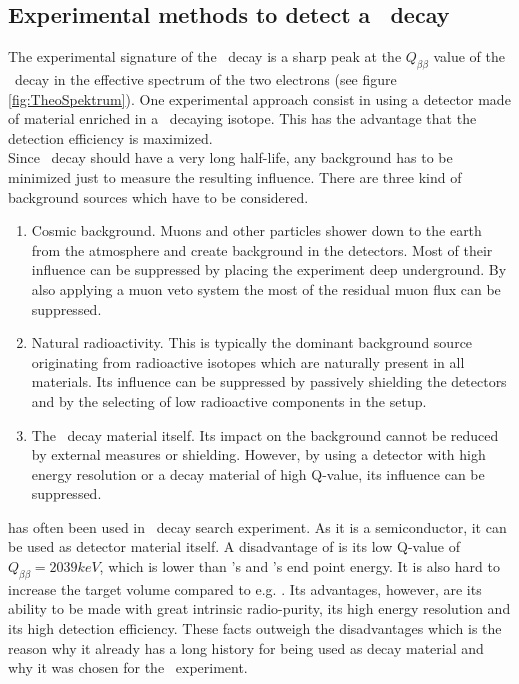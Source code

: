 \documentclass[encoding=utf8,british]{tumphthesis}
\begin{document}
\subsection{Experimental methods to detect a \onbb\ decay}

The experimental signature of the \onbb\ decay is a sharp peak at the $Q_{\beta\beta}$ value of the \twonu\ decay in the effective spectrum of the two electrons (see figure \ref{fig:TheoSpektrum}).
One experimental approach consist in using a detector made of material enriched in a \onbb\ decaying isotope.
This has the advantage that the detection efficiency is maximized.
\\

Since \onbb\ decay should have a very long half-life, any background has to be minimized just to measure the resulting influence.
There are three kind of background sources which have to be considered.
\begin{enumerate}
    \item Cosmic background.
Muons and other particles shower down to the earth from the atmosphere and create background in the detectors.
Most of their influence can be suppressed by placing the experiment deep underground.
By also applying a muon veto system the most of the residual muon flux can be suppressed.
\item Natural radioactivity.
This is typically the dominant background source originating from radioactive isotopes which are naturally present in all materials.
Its influence can be suppressed by passively shielding the detectors and by the selecting of low radioactive components in the setup. 
\item The \twonu\ decay material itself.
Its impact on the background cannot be reduced by external measures or shielding.
However, by using a detector with high energy resolution or a decay material of high Q-value, its influence can be suppressed.
\end{enumerate}
 has often been used in \onbb\ decay search experiment. 
As it is a semiconductor, it can be used as detector material itself.
A disadvantage of  is its low Q-value of $Q_{\beta\beta} = 2039\unit{keV}$, which is lower than 's and 's end point energy\cite{barabash_brief_2017}.
It is also hard to increase the target volume compared to e.g.  \cite{barabash_brief_2017}.
Its advantages, however, are its ability to be made with great intrinsic radio-purity, its high energy resolution and its high detection efficiency.
These facts outweigh the disadvantages which is the reason why it already has a long history for being used as decay material and why it was chosen for the \gerda\ experiment.
\\
\end{document}
